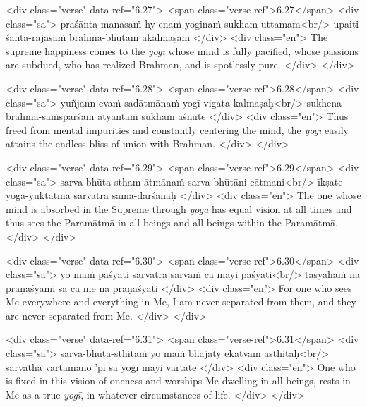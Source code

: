 \begin{html}
<div class="verse" data-ref="6.27">
  <span class="verse-ref">6.27</span>
  <div class="sa">
    praśānta-manasaṁ hy enaṁ yoginaṁ sukham uttamam<br/>
    upaiti śānta-rajasaṁ brahma-bhūtam akalmaṣam
  </div>
  <div class="en">
    The supreme happiness comes to the \textit{yogī} whose mind is fully pacified, whose passions are subdued, who has realized Brahman, and is spotlessly pure.
  </div>
</div>
\end{html}



\begin{html}
<div class="verse" data-ref="6.28">
  <span class="verse-ref">6.28</span>
  <div class="sa">
    yuñjann evaṁ sadātmānaṁ yogī vigata-kalmaṣaḥ<br/>
    sukhena brahma-saṁsparśam atyantaṁ sukham aśnute
  </div>
  <div class="en">
    Thus freed from mental impurities and constantly centering the mind, the \textit{yogī} easily attains the endless bliss of union with Brahman.
  </div>
</div>
\end{html}



\begin{html}
<div class="verse" data-ref="6.29">
  <span class="verse-ref">6.29</span>
  <div class="sa">
    sarva-bhūta-stham ātmānaṁ sarva-bhūtāni cātmani<br/>
    īkṣate yoga-yuktātmā sarvatra sama-darśanaḥ
  </div>
  <div class="en">
    The one whose mind is absorbed in the Supreme through \textit{yoga} has equal vision at all times and thus sees the Paramātmā in all beings and all beings within the Paramātmā.
  </div>
</div>
\end{html}



\begin{html}
<div class="verse" data-ref="6.30">
  <span class="verse-ref">6.30</span>
  <div class="sa">
    yo māṁ paśyati sarvatra sarvaṁ ca mayi paśyati<br/>
    tasyāhaṁ na praṇaśyāmi sa ca me na praṇaśyati
  </div>
  <div class="en">
    For one who sees Me everywhere and everything in Me, I am never separated from them, and they are never separated from Me.
  </div>
</div>
\end{html}



\begin{html}
<div class="verse" data-ref="6.31">
  <span class="verse-ref">6.31</span>
  <div class="sa">
    sarva-bhūta-sthitaṁ yo māṁ bhajaty ekatvam āsthitaḥ<br/>
    sarvathā vartamāno ’pi sa yogī mayi vartate
  </div>
  <div class="en">
    One who is fixed in this vision of oneness and worships Me dwelling in all beings, rests in Me as a true \textit{yogī}, in whatever circumstances of life.
  </div>
</div>
\end{html}



